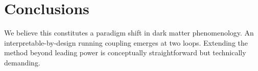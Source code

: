 \section{Conclusions}\label{sec:conclusions}

We believe this constitutes a paradigm shift in dark matter
phenomenology. An interpretable-by-design running coupling emerges at
two loops. Extending the method beyond leading power is conceptually
straightforward but technically demanding.

